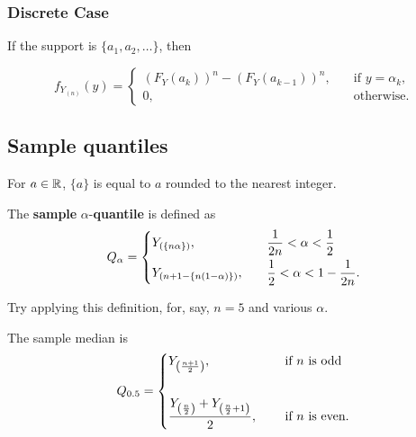 \subsubsection{Discrete Case}
If the support is $\{a_1,a_2,\dots\}$, then

$$
f_{Y_{(n)}}(y)=\begin{cases}(F_Y(a_k))^n-(F_Y(a_{k-1}))^n, \quad &\text{if } y=\alpha_k, \\
0, &\text{otherwise.}	
\end{cases}
$$

\subsection{Sample quantiles}
\begin{notation}
		For $a\in \mathbb R$, $\{a\}$ is equal to $a$ rounded to the nearest integer.  
\end{notation}

\begin{definition}
The \textbf{sample} $\alpha$-\textbf{quantile} is defined as
$$
Q_{\alpha}=\begin{dcases}
		Y_{(\{n\alpha\})}, \quad &\frac{1}{2n}<\alpha<\frac{1}{2} \\
		Y_{(n+1-\{n(1-\alpha)\})}, \quad & \frac{1}{2}<\alpha<1-\frac{1}{2n}. 
\end{dcases}
$$
\end{definition}
Try applying this definition, for, say, $n=5$ and various $\alpha$.

\begin{eg}
The sample median is
$$
Q_{0.5}=
\begin{dcases}Y_{\left(\frac{n+1}{2}\right)}, \quad &\text{ if $n$ is odd} \\
		\\
		\frac{Y_{\left(\frac{n}{2}\right)}+Y_{\left(\frac{n}{2}+1\right)}}{2}, \quad  &\text{ if $n$ is even}.
\end{dcases}
$$
\end{eg}
